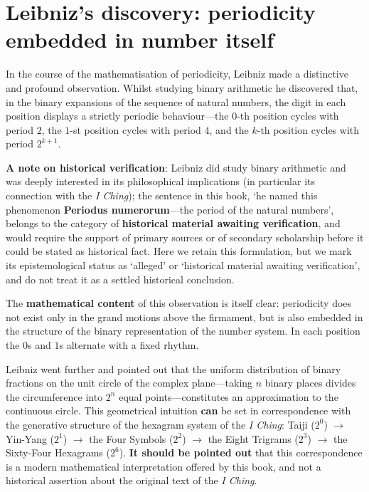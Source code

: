 \section*{Leibniz's discovery: periodicity embedded in number itself}

In the course of the mathematisation of periodicity, Leibniz made a distinctive and profound observation. Whilst studying binary arithmetic he discovered that, in the binary expansions of the sequence of natural numbers, the digit in each position displays a strictly periodic behaviour---the $0$-th position cycles with period $2$, the $1$-st position cycles with period $4$, and the $k$-th position cycles with period $2^{k+1}$.

\textbf{A note on historical verification}: Leibniz did study binary arithmetic and was deeply interested in its philosophical implications (in particular its connection with the \textit{I Ching}); the sentence in this book, `he named this phenomenon \textbf{Periodus numerorum}---the period of the natural numbers', belongs to the category of \textbf{historical material awaiting verification}, and would require the support of primary sources or of secondary scholarship before it could be stated as historical fact. Here we retain this formulation, but we mark its epistemological status as `alleged' or `historical material awaiting verification', and do not treat it as a settled historical conclusion.

The \textbf{mathematical content} of this observation is itself clear: periodicity does not exist only in the grand motions above the firmament, but is also embedded in the structure of the binary representation of the number system. In each position the $0$s and $1$s alternate with a fixed rhythm.

Leibniz went further and pointed out that the uniform distribution of binary fractions on the unit circle of the complex plane---taking $n$ binary places divides the circumference into $2^n$ equal points---constitutes an approximation to the continuous circle. This geometrical intuition \textbf{can} be set in correspondence with the generative structure of the hexagram system of the \textit{I Ching}: Taiji ($2^0$) $\to$ Yin-Yang ($2^1$) $\to$ the Four Symbols ($2^2$) $\to$ the Eight Trigrams ($2^3$) $\to$ the Sixty-Four Hexagrams ($2^6$). \textbf{It should be pointed out} that this correspondence is a modern mathematical interpretation offered by this book, and not a historical assertion about the original text of the \textit{I Ching}.

